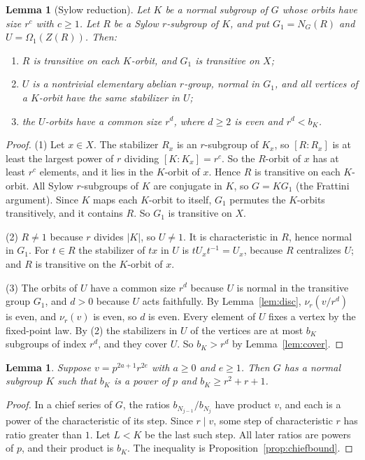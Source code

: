 \documentclass[11pt]{amsart}
\newtheorem{lemma}[theorem]{Lemma}
\theoremstyle{definition}
\theoremstyle{remark}
\begin{document}
\begin{lemma}[Sylow reduction]\label{lem:sylow}
Let $K$ be a normal subgroup of $G$ whose orbits have size $r^c$ with $c\ge1$. Let $R$ be a Sylow $r$-subgroup of $K$, and put $G_1=N_G(R)$ and $U=\Omega_1(Z(R))$. Then:
\begin{enumerate}
\item $R$ is transitive on each $K$-orbit, and $G_1$ is transitive on $X$;
\item $U$ is a nontrivial elementary abelian $r$-group, normal in $G_1$, and all vertices of a $K$-orbit have the same stabilizer in $U$;
\item the $U$-orbits have a common size $r^d$, where $d\ge2$ is even and $r^d<b_K$.
\end{enumerate}
\end{lemma}
\begin{proof}
(1) Let $x\in X$. The stabilizer $R_x$ is an $r$-subgroup of $K_x$, so $[R:R_x]$ is at least the largest power of $r$ dividing $[K:K_x]=r^c$. So the $R$-orbit of $x$ has at least $r^c$ elements, and it lies in the $K$-orbit of $x$. Hence $R$ is transitive on each $K$-orbit. All Sylow $r$-subgroups of $K$ are conjugate in $K$, so $G=KG_1$ (the Frattini argument). Since $K$ maps each $K$-orbit to itself, $G_1$ permutes the $K$-orbits transitively, and it contains $R$. So $G_1$ is transitive on $X$.

(2) $R\ne1$ because $r$ divides $|K|$, so $U\ne1$. It is characteristic in $R$, hence normal in $G_1$. For $t\in R$ the stabilizer of $tx$ in $U$ is $tU_xt^{-1}=U_x$, because $R$ centralizes $U$; and $R$ is transitive on the $K$-orbit of $x$.

(3) The orbits of $U$ have a common size $r^d$ because $U$ is normal in the transitive group $G_1$, and $d>0$ because $U$ acts faithfully. By Lemma~\ref{lem:disc}, $\nu_r(v/r^d)$ is even, and $\nu_r(v)$ is even, so $d$ is even. Every element of $U$ fixes a vertex by the fixed-point law. By (2) the stabilizers in $U$ of the vertices are at most $b_K$ subgroups of index $r^d$, and they cover $U$. So $b_K>r^d$ by Lemma~\ref{lem:cover}.
\end{proof}

\begin{lemma}\label{lem:lastr}
Suppose $v=p^{2a+1}r^{2e}$ with $a\ge0$ and $e\ge1$. Then $G$ has a normal subgroup $K$ such that $b_K$ is a power of $p$ and $b_K\ge r^2+r+1$.
\end{lemma}
\begin{proof}
In a chief series of $G$, the ratios $b_{N_{j-1}}/b_{N_j}$ have product $v$, and each is a power of the characteristic of its step. Since $r\mid v$, some step of characteristic $r$ has ratio greater than $1$. Let $L<K$ be the last such step. All later ratios are powers of $p$, and their product is $b_K$. The inequality is Proposition~\ref{prop:chiefbound}.
\end{proof}
\end{document}

